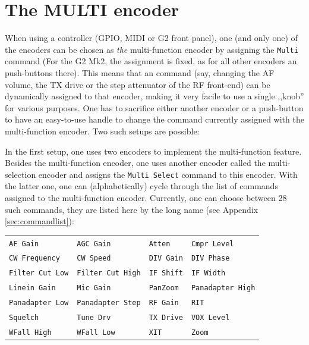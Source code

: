 \documentclass[12pt]{book}
\def\bltt#1{\texttt{\color{blue}#1}}
\begin{document}



\chapter{The MULTI encoder}
\label{sec:multiencoder}

When using a controller (GPIO, MIDI or G2 front panel), one (and only one) of the encoders can be chosen as
\textit{the} multi-function encoder by assigning the \bltt{Multi} command (For the G2 Mk2, the assignment
is fixed, as for all other encoders an push-buttons there).
This means that an command (say, changing the AF volume, the TX drive or
the step attenuator of the RF front-end) can be dynamically assigned to that encoder, making it very
facile to use a single ,,knob'' for various purposes. One has to sacrifice either another encoder
or a push-button to have an easy-to-use handle to change the command currently assigned with the
multi-function encoder. Two such setups are possible:

In the first setup, one uses two encoders to implement the multi-function feature. Besides the multi-function
encoder, one uses another encoder called the multi-selection encoder and assigns
the \bltt{Multi Select} command to this encoder. With the latter one, one can
(alphabetically) cycle
through the list of commands assigned to the multi-function encoder. Currently, one can choose between
28 such commands, they are listed here by the long name (see Appendix \ref{sec:commandlist}):

\begin{center}
\begin{tabular}{llll}
\bltt{AF Gain}         & \bltt{AGC Gain} & \bltt{Atten}       & \bltt{Cmpr Level}     \\
\bltt{CW Frequency} & \bltt{CW Speed}        & \bltt{DIV Gain} & \bltt{DIV Phase}  \\
\bltt{Filter Cut Low} & \bltt{Filter Cut High} & \bltt{IF Shift}        & \bltt{IF Width} \\
\bltt{Linein Gain} & \bltt{Mic Gain}       & \bltt{PanZoom} & \bltt{Panadapter High} \\
\bltt{Panadapter Low} & \bltt{Panadapter Step} & \bltt{RF Gain} & \bltt{RIT} \\
\bltt{Squelch} & \bltt{Tune Drv} & \bltt{TX Drive} & \bltt{VOX Level}  \\
\bltt{WFall High} & \bltt{WFall Low} & \bltt{XIT} & \bltt{Zoom}
\end{tabular}
\end{center}
\end{document}
